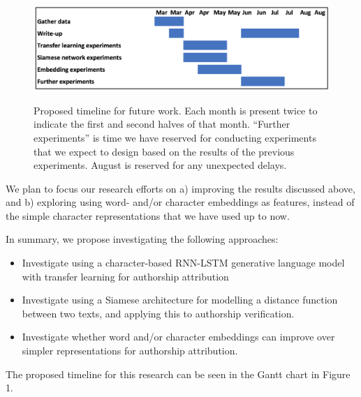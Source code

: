 \begin{figure}[h]
    \includegraphics[width=\textwidth]{gantt}
\label{fig:model}
\caption{Proposed timeline for future work. Each month is present twice to indicate the first and second halves of that month. 
``Further experiments'' is time we have reserved for conducting experiments that we expect to design based on the results of the previous experiments. August is reserved for any unexpected delays.}
\end{figure}

We plan to focus our research efforts on a) improving the results discussed above, and b) exploring using word- and/or character embeddings as features, instead of the simple character representations that we have used up to now.

In summary, we propose investigating the following approaches:
\begin{itemize}
    \item Investigate using a character-based RNN-LSTM generative language model with transfer learning for authorship attribution
    \item Investigate using a Siamese architecture for modelling a distance function between two texts, and applying this to authorship verification.
    \item Investigate whether word and/or character embeddings can improve over simpler representations for authorship attribution.
\end{itemize}

The proposed timeline for this research can be seen in the Gantt chart in Figure 1.


